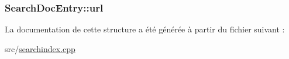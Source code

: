 \subsubsection[{url}]{ Search\+Doc\+Entry\+::url}\label{struct_search_doc_entry_abe8caf3bff9736a11702102da14232aa}


La documentation de cette structure a été générée à partir du fichier suivant \+:\begin{DoxyCompactItemize}
\item 
src/\hyperlink{searchindex_8cpp}{searchindex.\+cpp}\end{DoxyCompactItemize}
